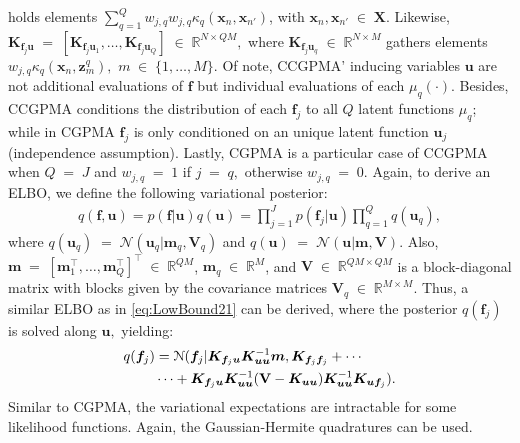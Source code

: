 \documentclass[journal]{IEEEtran}
\providecommand{\ve}[1]{{\bm{#1}}}%
\providecommand{\mat}[1]{{\bm{#1}}} %
\newcommand{\Real}{\mathbb{R}}
\DeclareMathOperator{\en}{\!\,\in\!\,}
\DeclareMathOperator{\igual}{\!\,=\!\,}
\providecommand{\ve}[1]{{\mathbf{#1}}}
\providecommand{\mat}[1]{{\mathbf{#1}}}
\newcommand{\boldV}{\mathbf{V}}
\newcommand{\gauss}{\mathcal{N}} %
\begin{document}
holds elements $\sum_{q=1}^{Q}w_{j,q}w_{j,q}{\kappa}_q(\ve{x}_n,\ve{x}_{n'})$, with $\ve{x}_n,\ve{x}_{n'}\en\mat{X}$. Likewise, $\mat{K}_{\ve{f}_j{\ve{u}}}\igual [\mat{K}_{\ve{f}_j\ve{u}_1}, \dots , \mat{K}_{\ve{f}_j\ve{u}_Q}]\en \Real^{N\times QM},$ where $\mat{K}_{\ve{f}_j\ve{u}_q} \en \Real^{N\times M}$ gathers elements $w_{j,q}{\kappa}_q(\ve{x}_n, \ve{z}^q_m),$ $m\en\{1,\dots,M\}.$ Of note, CCGPMA' inducing variables ${\ve{u}}$ are not additional evaluations of ${\ve{f}}$ but individual evaluations of each $\mu_q(\cdot)$. Besides, CCGPMA conditions the distribution of each $\ve{f}_j$ to all $Q$ latent functions $\mu_q$; while in CGPMA $\ve{f}_j$ is only conditioned on an unique latent function $\ve{u}_j$ (independence assumption). Lastly, CGPMA is a particular case of CCGPMA when $Q\igual J$ and $w_{j,q}\igual 1$ if $j\igual q,$ otherwise $w_{j,q}\igual 0.$ Again, to derive an ELBO, we define the following variational posterior:
\begin{align}
q({\ve{f}}, {\ve{u}}) = p({\ve{f}}|{\ve{u}})q({\ve{u}})= \prod_{j=1}^{J}p(\ve{f}_j|{\ve{u}})\prod_{q=1}^{Q}q(\ve{u}_q),
\end{align}
where $q(\ve{u}_q)\igual\gauss(\ve{u}_q|\ve{m}_q,\mat{V}_q)$ and $q({\ve{u}})\igual \gauss({\ve{u}}|\ve{m},\mat{V})$.  Also, $\ve{m} \igual [\ve{m}_1^{\top}, \dots , \ve{m}_Q^{\top}]^{\top}\en \Real^{QM}$, $\ve{m}_q\en\Real^{M}$, and $\mat{V}\en \Real^{QM\times QM}$ is a block-diagonal matrix with blocks given by the covariance matrices $\mat{V}_q\en \Real^{M\times M}$. Thus, a similar ELBO as in \cref{eq:LowBound21} can be derived, where the posterior $q(\ve{f}_j)$ is solved along ${\ve{u}},$ yielding:
\begin{align}
\notag q(\ve{f}_j) &=\gauss(\ve{f}_j|\mat{K}_{\ve{f}_j\ve{u}}\mat{K}_{\ve{u}\ve{u}}^{-1}\ve{m}, \mat{K}_{\ve{f}_j\ve{f}_j}+\cdots\\
& \cdots + \mat{K}_{\ve{f}_j\ve{u}}\mat{K}_{\ve{u}\ve{u}}^{-1}(\boldV-\mat{K}_{\ve{u}\ve{u}})\mat{K}_{\ve{u}\ve{u}}^{-1}\mat{K}_{\ve{u}\ve{f}_j}).
\end{align}
Similar to CGPMA, the variational expectations are intractable for some likelihood functions. Again, the Gaussian-Hermite quadratures can be used.
\end{document}
